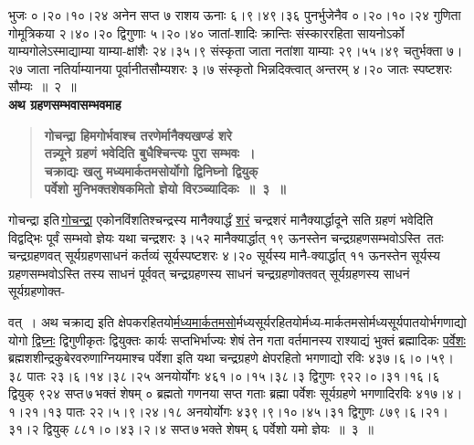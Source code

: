 \documentclass[11pt, openany]{book}
\begin{document}
\begin{sloppypar}
\noindent भुजः ०।२०।१०।२४ अनेन सप्त ७ राशय ऊनाः ६।९।४९।३६ पुनर्भुजेनैव ०।२०।१०।२४ गुणिता गोमूत्रिकया २।४०।२० द्विगुणाः ५।२०।४० जातां-शादिः क्रान्तिः संस्काररहिता सायनोऽर्को याम्यगोलेऽस्माद्याम्या याम्या-क्षांशैः २४।३५।९ संस्कृता जाता नतांशा याम्याः २९।५५।४९ चतुर्भक्ता ७।२७ जाता नतिर्याम्यानया पूर्वानीतसौम्यशरः ३।७ संस्कृतो भिन्नदिक्त्वात् अन्तरम् ४।२० जातः स्पष्टशरः सौम्यः~॥~२~॥\\

{\small \textbf{अथ ग्रहणसम्भवासम्भवमाह\textendash }}

 \label{10.3}
\begin{quote}
{\large \textbf{{\color{purple}गोचन्द्रा हिमगोर्भवाश्च तरणेर्मानैक्यखण्डं शरे \\
तन्न्यूने ग्रहणं भवेदिति बुधैश्चिन्त्यः पुरा सम्भवः~।\\
चक्राद्यः खलु मध्यमार्कतमसोर्योगो द्विनिघ्नो द्वियुक् \\
पर्वेशो मुनिभक्तशेषकमितो ज्ञेयो विरञ्च्यादिकः~॥~३~॥}}}
\end{quote}

गोचन्द्रा इति\textendash \,\hyperref[10.3]{गोचन्द्रा} एकोनविंशतिश्चन्द्रस्य मानैक्यार्द्धं \hyperref[10.3]{शरं} चन्द्रशरं मानैक्यार्द्धादूने सति ग्रहणं भवेदिति विद्वद्भिः पूर्वं सम्भवो ज्ञेयः यथा चन्द्रशरः ३।५२ मानैक्यार्द्धात् १९ ऊनस्तेन चन्द्रग्रहणसम्भवोऽस्ति~ततः चन्द्रग्रहणवत् सूर्यग्रहणसाधनं कर्तव्यं सूर्यस्पष्टशरः ४।२० सूर्यस्य मानै-क्यार्द्धात् ११ ऊनस्तेन सूर्यस्य ग्रहणसम्भवोऽस्ति तस्य साधनं पूर्ववत् चन्द्रग्रहणस्य साधनं चन्द्रग्रहणोक्तवत् सूर्यग्रहणस्य साधनं सूर्यग्रहणोक्त-
\end{sloppypar}

\newpage

\begin{sloppypar}
\noindent वत्~। अथ चक्राद्य इति क्षेपकरहितयो\hyperref[10.3]{र्मध्यमार्कतमसो}र्मध्यसूर्यरहितयोर्मध्य-मार्कतमसोर्मध्यसूर्यपातयोर्भगणाद्यो योगो \hyperref[10.3]{द्विघ्नः} द्विगुणीकृतः द्वियुक्तः कार्यः सप्तभिर्भाज्यः शेषं तेन गता वर्तमानस्य राश्याद्यं भुक्तं ब्रह्मादिकः \hyperref[10.3]{पर्वेशः} ब्रह्मशशीन्द्रकुबेरवरुणाग्नियमाश्च पर्वेशा इति यथा चन्द्रग्रहणे क्षेपरहितो भगणाद्यो रविः ४३७।६।०।५९।३८ पातः २३।६।१४।३८।२५ अनयोर्योगः ४६१।०।१५।३८।३ द्विगुणः ९२२।०।३१।१६।६ द्वियुक् ९२४ सप्त\textendash \,७\textendash \,भक्तं शेषम् ० ब्रह्मतो गणनया सप्त गताः ब्रह्मा पर्वेशः सूर्यग्रहणे भगणादिरविः ४१७।४।१।२१।१३ पातः २२।५।९।२४।१८ अनयोर्योगः ४३९।९।१०।४५।३१ द्विगुणः ८७९।६।२१।३१।२ द्वियुक् ८८१।०।४३।२।४ सप्त\textendash \,७\textendash \,भक्ते शेषम् ६ पर्वेशो यमो ज्ञेयः~॥~३~॥\\
\end{sloppypar}
\end{document}
